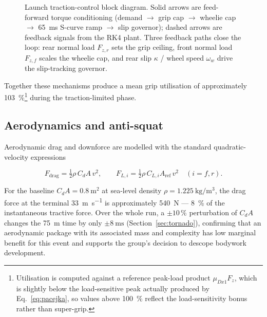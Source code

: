 \begin{figure}[htbp]
\begin{singlespace}
\end{singlespace}
\caption{Launch traction-control block diagram. Solid arrows are feed-forward
torque conditioning (demand $\to$ grip cap $\to$ wheelie cap $\to$ \SI{65}{\milli\second}
S-curve ramp $\to$ slip governor); dashed arrows are feedback signals from the
RK4 plant. Three feedback paths close the loop: rear normal load $F_{z,r}$ sets the
grip ceiling, front normal load $F_{z,f}$ scales the wheelie cap, and rear
slip $\kappa$ / wheel speed $\omega_w$ drive the slip-tracking governor.}
\label{fig:launch_control_flow}
\end{figure}

Together these mechanisms produce a
mean grip utilisation of approximately
\SI{103}{\percent}\footnote{Utilisation is computed against a
reference peak-load product $\mu_{Dx1} F_z$, which is slightly below
the load-sensitive peak actually produced by
Eq.~\ref{eq:pacejka}, so values above \SI{100}{\percent} reflect the
load-sensitivity bonus rather than super-grip.} during the
traction-limited phase.

\subsection{Aerodynamics and anti-squat}
\label{sec:aero}

Aerodynamic drag and downforce are modelled with the standard
quadratic-velocity expressions

\begin{equation}
F_\text{drag} = \tfrac{1}{2} \rho \, C_d A \, v^2,
\qquad
F_{L,i} = \tfrac{1}{2} \rho \, C_{L,i} A_\text{ref} \, v^2
\quad (i = f, r).
\label{eq:aero}
\end{equation}

For the baseline $C_d A = \SI{0.8}{\metre\squared}$ at sea-level
density $\rho = \SI{1.225}{\kilo\gram\per\metre\cubed}$, the drag
force at the terminal \SI{33}{\metre\per\second} is approximately
\SI{540}{\newton} --- \SI{8}{\percent} of the instantaneous tractive
force. Over the whole run, a $\pm 10\,\%$ perturbation of $C_d A$
changes the \SI{75}{\metre} time by only $\pm\SI{8}{\milli\second}$
(Section~\ref{sec:tornado}), confirming that an aerodynamic package
with its associated mass and complexity has low marginal benefit for
this event and supports the group's decision to descope bodywork
development.

